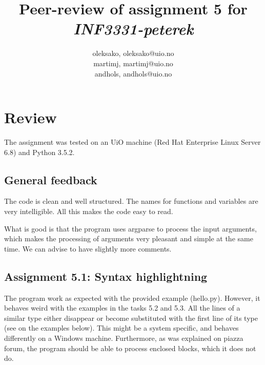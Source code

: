 \documentclass[a4paper]{article}
\title{Peer-review of assignment 5 for \textit{INF3331-peterek}}
\author{oleksako, {oleksako@uio.no} \\
 		martimj, {martimj@uio.no} \\
		andhols, {andhols@uio.no}}
\begin{document}
\maketitle

\section{Review}\label{sec:review}

The assignment was tested on an UiO machine (Red Hat Enterprise Linux Server 6.8) and Python 3.5.2.

\subsection*{General feedback}
The code is clean and well structured. The names for functions and variables are very intelligible. All this makes the code easy to read.

What is good is that the program uses argparse to process the input arguments, which makes the processing of arguments very pleasant and simple at the same time. We can advise to have slightly more comments.

\subsection*{Assignment 5.1: Syntax highlightning}

The program work as expected with the provided example (hello.py). However, it behaves weird with the examples in the tasks 5.2 and 5.3. All the lines of a similar type either disappear or become substituted with the first line of its type (see on the examples below). This might be a system specific, and behaves differently on a Windows machine. Furthermore, as was explained on piazza forum, the program should be able to process enclosed blocks, which it does not do. 
\end{document}
